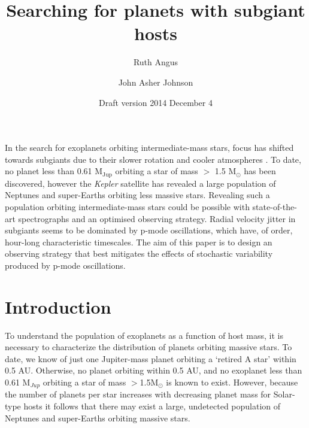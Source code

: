 \documentclass[useAMS, usenatbib]{aastex}
\title{Searching for planets with subgiant hosts}
\author{Ruth Angus}
\affil{Department of Physics, University of Oxford, UK}
\author{John Asher Johnson}
\affil{Harvard-Smithsonian Center for Astrophysics, Cambridge,
MA, USA}
\begin{document}
\date{Draft version 2014 December 4}
\maketitle


In the search for exoplanets orbiting intermediate-mass stars, focus has
shifted towards subgiants due to their slower rotation and cooler atmospheres
\citep{Johnson2014}.
To date, no planet less than 0.61 M$_{\mathrm{Jup}}$ orbiting a star of mass
$>$ 1.5 M$_\odot$ has been discovered, however the {\it Kepler} satellite has
revealed a large population of Neptunes and super-Earths orbiting less massive
stars.
Revealing such a population orbiting intermediate-mass stars could be possible
with state-of-the-art spectrographs and an optimised observing strategy.
Radial velocity jitter in subgiants seems to be dominated by p-mode
oscillations, which have, of order, hour-long characteristic timescales.
The aim of this paper is to design an observing strategy that best mitigates
the effects of stochastic variability produced by p-mode oscillations.


\section{Introduction}
\label{intro}

To understand the population of exoplanets as a function of host mass, it is
necessary to characterize the distribution of planets orbiting massive
stars.
To date, we know of just one Jupiter-mass planet orbiting a `retired A star'
within 0.5 AU.
Otherwise, no planet orbiting within 0.5 AU, and no exoplanet less than 0.61
M$_{Jup}$ orbiting a star of mass $>$1.5M$_{\odot}$ is known to exist.
However, because the number of planets per star increases with decreasing
planet mass for Solar-type hosts it follows that there may exist a large,
undetected population of Neptunes and super-Earths orbiting massive stars.


\end{document}
